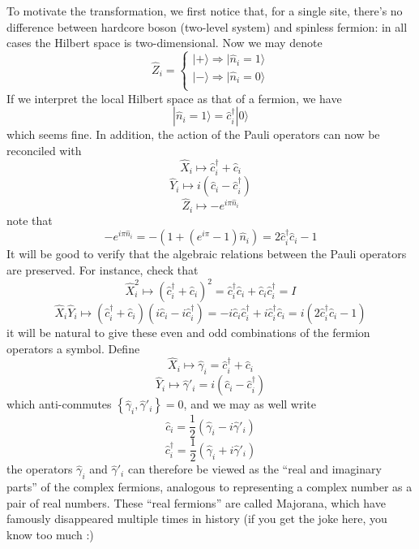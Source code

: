 To motivate the transformation, we first notice that, for a single site, there's no difference between hardcore boson (two-level system) and spinless fermion: in all cases the Hilbert space is two-dimensional. Now we may denote
\[ \hat{Z}_i=\begin{cases}
	|+\rangle \Rightarrow |\hat{n}_i=1\rangle\\
	|-\rangle \Rightarrow |\hat{n}_i=0\rangle\\
\end{cases}\]
If we interpret the local Hilbert space as that of a fermion, we have
\[ |\hat{n}_i=1\rangle =\hat{c}_{i}^{\dagger}|0\rangle \]
which seems fine. In addition, the action of the Pauli operators can now be reconciled with
\[ \hat{X}_i\mapsto \hat{c}_{i}^{\dagger}+\hat{c}_i\]
\[ \hat{Y}_i\mapsto i\left( \hat{c}_i-\hat{c}_{i}^{\dagger} \right) \]
\[ \hat{Z}_i\mapsto -e^{i\pi \hat{n}_i}\]
note that
\[ -e^{i\pi \hat{n}_i}=-\left( 1+\left( e^{i\pi}-1 \right) \hat{n}_i \right) =2\hat{c}_{i}^{\dagger}\hat{c}_i-1\]
It will be good to verify that the algebraic relations between the Pauli operators are preserved. For instance, check that
\[ \hat{X}_{i}^{2}\mapsto \left( \hat{c}_{i}^{\dagger}+\hat{c}_i \right) ^2=\hat{c}_{i}^{\dagger}\hat{c}_i+\hat{c}_i\hat{c}_{i}^{\dagger}=I\]
\[ \hat{X}_i\hat{Y}_i\mapsto \left( \hat{c}_{i}^{\dagger}+\hat{c}_i \right) \left( i\hat{c}_i-i\hat{c}_{i}^{\dagger} \right) =-i\hat{c}_i\hat{c}_{i}^{\dagger}+i\hat{c}_{i}^{\dagger}\hat{c}_i=i\left( 2\hat{c}_{i}^{\dagger}\hat{c}_i-1 \right) \]
it will be natural to give these even and odd combinations of the fermion operators a symbol. Define
\[ \hat{X}_i\mapsto \hat{\gamma}_i=\hat{c}_{i}^{\dagger}+\hat{c}_i\]
\[ \hat{Y}_i\mapsto \hat{\gamma}'_i=i\left( \hat{c}_i-\hat{c}_{i}^{\dagger} \right) \]
which anti-commutes $\left\{ \hat{\gamma}_i,\hat{\gamma}'_i \right\} =0$, and we may as well write
\[ \hat{c}_i=\frac{1}{2}\left( \hat{\gamma}_i-i\hat{\gamma}'_i \right) \]
\[ \hat{c}_{i}^{\dagger}=\frac{1}{2}\left( \hat{\gamma}_i+i\hat{\gamma}'_i \right) \]
the operators $\hat{\gamma}_i$ and $\hat{\gamma}'_i$ can therefore be viewed as the ``real and imaginary parts'' of the complex fermions, analogous to representing a complex number as a pair of real numbers. These ``real fermions'' are called Majorana, which have famously disappeared multiple times in history (if you get the joke here, you know too much :)

